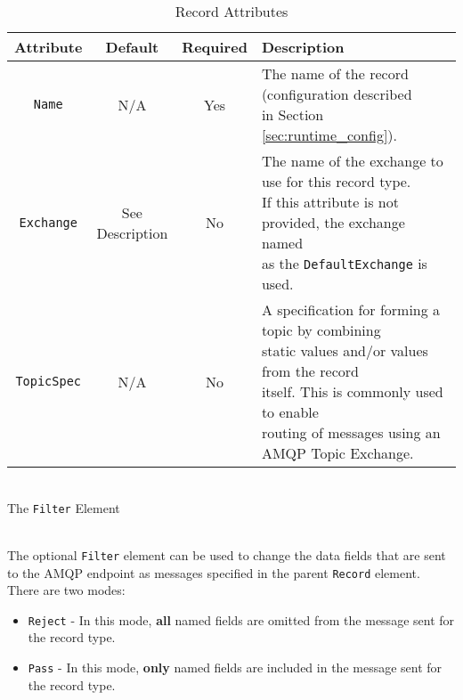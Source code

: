 \begin{table}[h]
    \caption{Record Attributes}        
    \begin{tabularx}{\textwidth}{cccl}
        \toprule
        \textbf{Attribute} & \textbf{Default} & \textbf{Required} & \textbf{Description}\\
        \midrule
        \texttt{Name} & N/A & Yes & \makecell[l]{The name of the record (configuration described\\
        in Section \ref{sec:runtime_config}).\\
        }\\
        \midrule
        \texttt{Exchange} & \makecell[c]{See\\Description} & No & \makecell[l]{The name of the exchange to use for this record type.\\
        If this attribute is not provided, the exchange named\\
        as the \texttt{DefaultExchange} is used.\\
        }\\
        \midrule
        \texttt{TopicSpec} & N/A & No & \makecell[l]{A specification for forming a topic by combining\\
        static values and/or values from the record\\
        itself. This is commonly used to enable\\
        routing of messages using an AMQP Topic Exchange.\\
        }\\
        \bottomrule
    \end{tabularx}
\end{table}



\par{\noindent\\The \texttt{Filter} Element}


\noindent\\The optional \texttt{Filter} element can be used to change the data fields that are sent to the AMQP endpoint
as messages specified in the parent \texttt{Record} element. There are two modes:


\begin{itemize}
    \item \texttt{Reject} - In this mode, \textbf{all} named fields are omitted from the message sent for the record type.
    \item \texttt{Pass} - In this mode, \textbf{only} named fields are included in the message sent for the record type.
\end{itemize}

